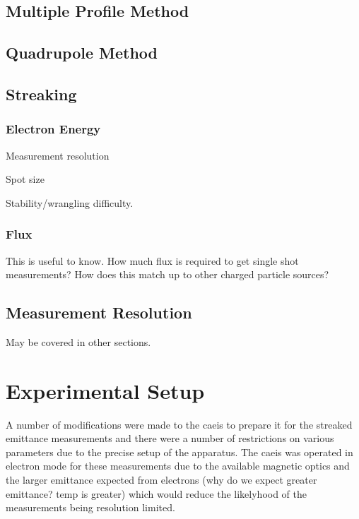 \subsection{Multiple Profile Method}

\subsection{Quadrupole Method}

\subsection{Streaking}

\subsubsection{Electron Energy}

Measurement resolution


Spot size


Stability/wrangling difficulty.


\subsubsection{Flux}

This is useful to know.
How much flux is required to get single shot measurements?
How does this match up to other charged particle sources?

\subsection{Measurement Resolution}

May be covered in other sections.


\section{Experimental Setup}

A number of modifications were made to the \gls{caeis} to prepare it for the streaked emittance measurements and there were a number of restrictions on various parameters due to the precise setup of the apparatus.
The \gls{caeis} was operated in electron mode for these measurements due to the available magnetic optics and the larger emittance expected from electrons {\color{red}(why do we expect greater emittance? temp is greater)} which would reduce the likelyhood of the measurements being resolution limited.

